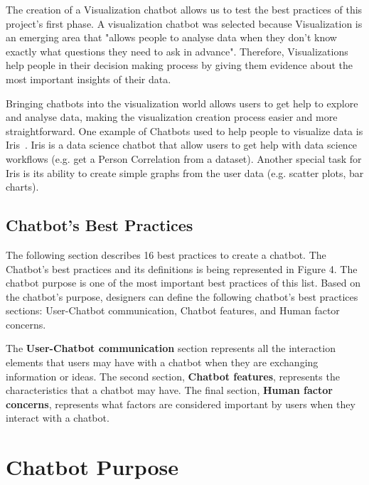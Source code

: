 \documentclass[a4paper,10pt]{article}
\begin{document}
The creation of a Visualization chatbot allows us to test the best practices of this project's first phase. A visualization chatbot was selected because Visualization is an emerging area that "allows people to analyse data when they don't know exactly what questions they need to ask in advance"\cite{munzner2014visualization}. Therefore, Visualizations help people in their decision making process by giving them evidence about the most important insights of their data.

Bringing chatbots into the visualization world allows users to get help to explore and analyse data, making the visualization creation process easier and more straightforward.  One example of Chatbots used to help people to visualize data is Iris~\cite{Iris}. Iris is a data science chatbot that allow users to get help with data science workflows (e.g. get a Person Correlation from a dataset). Another special task for Iris is its ability to create simple graphs from the user data (e.g. scatter plots, bar charts).    




\begin{center}
	\section*{ Chatbot's Best Practices}
\end{center}

The following section describes 16 best practices to create a chatbot. The Chatbot's best practices and its definitions is being represented in Figure 4. The chatbot purpose is one of the most important best practices of this list. Based on the chatbot's purpose, designers can define the following chatbot's best practices sections: User-Chatbot communication, Chatbot features, and Human factor concerns. 

The \textbf{User-Chatbot communication} section represents all the interaction elements that users may have with a chatbot when they are exchanging information or ideas. The second section, \textbf{Chatbot features}, represents the characteristics that a chatbot may have. The final section, \textbf{Human factor concerns}, represents what factors are considered important by users when they interact with a chatbot.  

\section{Chatbot Purpose}
\end{document}
